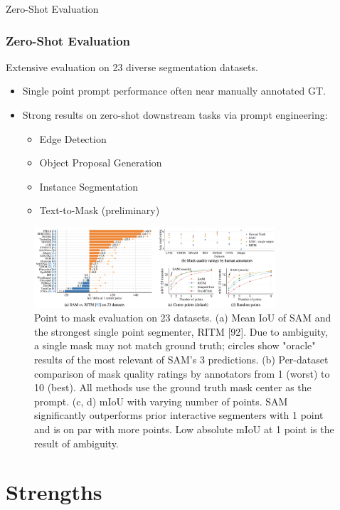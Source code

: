 \documentclass{beamer}
\begin{document}
\begin{frame}{Zero-Shot Evaluation}
    \frametitle{Zero-Shot Evaluation}
    Extensive evaluation on 23 diverse segmentation datasets.
    \begin{itemize}
        \item Single point prompt performance often near manually annotated GT.
        \item Strong results on zero-shot downstream tasks via prompt engineering:
        \vspace{-1em}
        \begin{itemize}
            \item Edge Detection
            \item Object Proposal Generation
            \item Instance Segmentation
            \item Text-to-Mask (preliminary)
        \end{itemize}
    \end{itemize}
    \begin{figure}
        \centering
        \includegraphics[width=0.8\textwidth]{figures/zero_shot_performance.png}
        \caption{Point to mask evaluation on 23 datasets. (a) Mean IoU of SAM and the strongest single point segmenter, RITM [92].
        Due to ambiguity, a single mask may not match ground truth; circles show "oracle" results of the most relevant of SAM's 3
        predictions. (b) Per-dataset comparison of mask quality ratings by annotators from 1 (worst) to 10 (best). All methods use
        the ground truth mask center as the prompt. (c, d) mIoU with varying number of points. SAM signiﬁcantly outperforms prior
        interactive segmenters with 1 point and is on par with more points. Low absolute mIoU at 1 point is the result of ambiguity.}
        \label{fig:zero_shot_performance}
    \end{figure}
\end{frame}

\section{Strengths}
\end{document}
